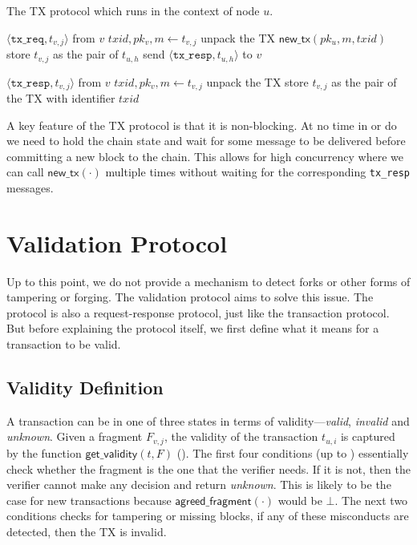 \begin{algorithm}
    \caption{The TX protocol which runs in the context of node $u$.}
    \label{alg:tx-proto}

    \begin{algorithmic}
        \Upon $\langle \texttt{tx\_req}, t_{v, j} \rangle$ from $v$
        \State $txid, pk_v, m \gets t_{v, j}$ \Comment unpack the TX
        \State $\textsf{new\_tx}(pk_u, m, txid)$
        \State store $t_{v, j}$ as the pair of $t_{u, h}$
        \State send $\langle \texttt{tx\_resp}, t_{u, h} \rangle$ to $v$

        \Upon $\langle \texttt{tx\_resp}, t_{v, j} \rangle$ from $v$
        \State $txid, pk_v, m \gets t_{v, j}$ \Comment unpack the TX
        \State store $t_{v, j}$ as the pair of the TX with identifier $txid$
    \end{algorithmic}
\end{algorithm}

A key feature of the TX protocol is that it is non-blocking.
At no time in  or  do we need to hold the chain state and wait for some message to be delivered before committing a new block to the chain.
This allows for high concurrency where we can call $\textsf{new\_tx}(\cdot)$ multiple times without waiting for the corresponding \texttt{tx\_resp} messages.

\section{Validation Protocol}
\label{sec:vd-protocol}

Up to this point, we do not provide a mechanism to detect forks or other forms of tampering or forging.
The validation protocol aims to solve this issue.
The protocol is also a request-response protocol, just like the transaction protocol.
But before explaining the protocol itself, we first define what it means for a transaction to be valid.

\subsection{Validity Definition}
A transaction can be in one of three states in terms of validity---\emph{valid}, \emph{invalid} and \emph{unknown}.
Given a fragment $F_{v, j}$, the validity of the transaction $t_{u, i}$ is captured by the function $\textsf{get\_validity}(t, F)$ ().
The first four conditions (up to ) essentially check whether the fragment is the one that the verifier needs.
If it is not, then the verifier cannot make any decision and return \emph{unknown}.
This is likely to be the case for new transactions because $\textsf{agreed\_fragment}(\cdot)$ would be $\bot$.
The next two conditions checks for tampering or missing blocks, if any of these misconducts are detected, then the TX is invalid.

